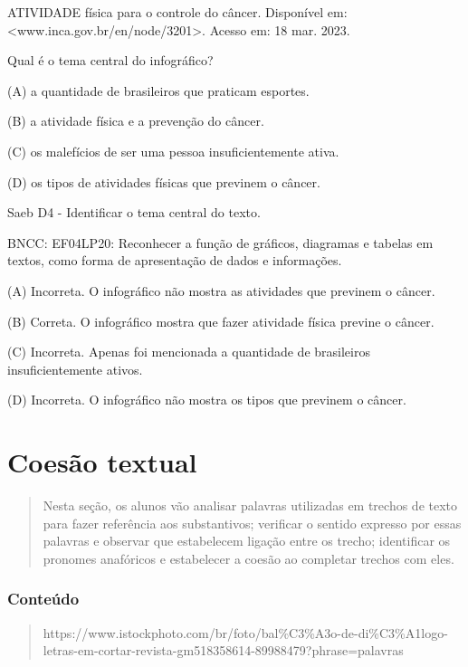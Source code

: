 \begin{escolha}
\begin{escolha}
{\protect\hypertarget{_Hlk40547643}{}{}

ATIVIDADE física para o controle do câncer. Disponível em:
\textless{}www.inca.gov.br/en/node/3201\textgreater{}. Acesso em: 18
mar. 2023.

Qual é o tema central do infográfico?

(A) a quantidade de brasileiros que praticam esportes.

(B) a atividade física e a prevenção do câncer.

(C) os malefícios de ser uma pessoa insuficientemente ativa.

(D) os tipos de atividades físicas que previnem o câncer.

Saeb D4 - Identificar o tema central do texto.

BNCC: EF04LP20: Reconhecer a função de gráficos, diagramas e tabelas em
textos, como forma de apresentação de dados e informações.

(A) Incorreta. O infográfico não mostra as atividades que previnem o
câncer.

(B) Correta. O infográfico mostra que fazer atividade física previne o
câncer.

(C) Incorreta. Apenas foi mencionada a quantidade de brasileiros
insuficientemente ativos.

(D) Incorreta. O infográfico não mostra os tipos que previnem o câncer.

\chapter{Coesão textual}

\begin{quote}
Nesta seção, os alunos vão analisar palavras utilizadas em trechos de
texto para fazer referência aos substantivos; verificar o sentido
expresso por essas palavras e observar que estabelecem ligação entre os
trecho; identificar os pronomes anafóricos e estabelecer a coesão ao
completar trechos com eles.
\end{quote}

\subsection{Conteúdo}\label{conteuxfado-9}

\begin{quote}
https://www.istockphoto.com/br/foto/bal\%C3\%A3o-de-di\%C3\%A1logo-letras-em-cortar-revista-gm518358614-89988479?phrase=palavras


\end{quote}}
\end{escolha}
\end{escolha}
